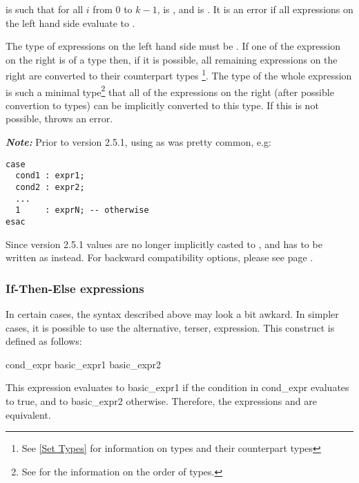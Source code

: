 \noindent is  such that for all $i$ from
$0$ to $k-1$,  is , and
 is .
%
It is an error if all expressions on the left hand side evaluate
to .

The type of expressions on the left hand side must be \Boolean.  If
one of the expression on the right is of a \Set type then, if it is
possible, all remaining expressions on the right are converted to
their counterpart \Set types \footnote{See \ref{Set Types} for
information on \Set types and their counterpart types}. The type of
the whole expression is such a minimal type\footnote{See  for the information on the order of types.} that all of the
expressions on the right (after possible convertion to \Set types) can
be implicitly converted to this type.
%
If this is not possible, \nusmv throws an error.

\bigskip
\textbf{\textit{Note:}}
\label{ref::caseconditionexample}
Prior to version 2.5.1, using 
as  was pretty common, e.g:
\begin{verbatim}
case 
  cond1 : expr1;
  cond2 : expr2;
  ...
  1     : exprN; -- otherwise
esac
\end{verbatim}

Since version 2.5.1 \Integer values are no longer implicitly casted
to \Boolean, and  has to be written as  instead.
For backward compatibility options, please see page
\pageref{ref::backwardcompatibility}.

\subsubsection{If-Then-Else expressions}
\label{If-Then-Else expressions}

In certain cases, the syntax described above may look a bit awkard. In
simpler cases, it is possible to use the alternative, terser,
\itebullet expression. This construct is defined as follows:

\begin{Grammar}
        cond_expr  basic_expr1 \operator{:} basic_expr2
\end{Grammar}

This expression evaluates to basic\_expr1 if the condition in
    cond\_expr evaluates to true, and to basic\_expr2 otherwise.
Therefore, the expressions  and  are equivalent.

